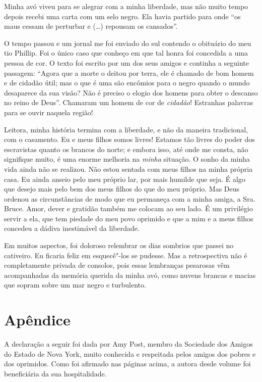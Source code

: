 Minha avó viveu para se alegrar com a
minha liberdade, mas não muito tempo depois recebi uma carta com um selo
negro. Ela havia partido para onde ``os maus cessam de perturbar e
(\ldots{}) repousam os cansados''.

O tempo passou e um jornal me foi
enviado do sul contendo o obituário do meu tio Phillip. Foi o único caso
que conheço em que tal honra foi concedida a uma pessoa de cor. O texto
foi escrito por um dos seus amigos e continha a seguinte passagem:
``Agora que a morte o deitou por terra, ele é chamado de bom homem e de
cidadão útil; mas o que é uma são encômios para o negro quando o mundo
desaparece da sua visão? Não é preciso o elogio dos homens para obter o
descanso no reino de Deus''. Chamaram um homem de cor de \emph{cidadão}!
Estranhas palavras para se ouvir naquela região!

Leitora, minha história termina com a
liberdade, e não da maneira tradicional, com o casamento. Eu e meus
filhos somos livres! Estamos tão livres do poder dos escravistas quanto
os brancos do norte; e embora isso, até onde me consta, não signifique
muito, é uma enorme melhoria na \emph{minha} situação. O sonho da minha
vida ainda não se realizou. Não estou sentada com meus filhos na minha
própria casa. Eu ainda anseio pelo meu próprio lar, por mais humilde que
seja. É algo que desejo mais pelo bem dos meus filhos do que do meu
próprio. Mas Deus ordenou as circunstâncias de modo que eu permaneça com
a minha amiga, a Sra.\,Bruce. Amor, dever e gratidão também me colocam ao
seu lado. É um privilégio servir a ela, que tem piedade do meu povo
oprimido e que a mim e a meus filhos concedeu a dádiva inestimável da
liberdade.

Em muitos aspectos, foi doloroso
relembrar os dias sombrios que passei no cativeiro. Eu ficaria feliz em
esquecê"-los se pudesse. Mas a retrospectiva não é completamente privada
de consolos, pois essas lembranças pesarosas vêm acompanhadas da memória
querida da minha avó, como nuvens brancas e macias que sopram sobre um
mar negro e turbulento.

\chapter*{Apêndice}

\begin{flushright}
\end{flushright} 

A declaração a seguir foi dada por Amy
Post, membro da Sociedade dos Amigos do Estado de Nova York, muito
conhecida e respeitada pelos amigos dos pobres e dos oprimidos. Como foi
afirmado nas páginas acima, a autora desde volume foi beneficiária da
sua hospitalidade.

